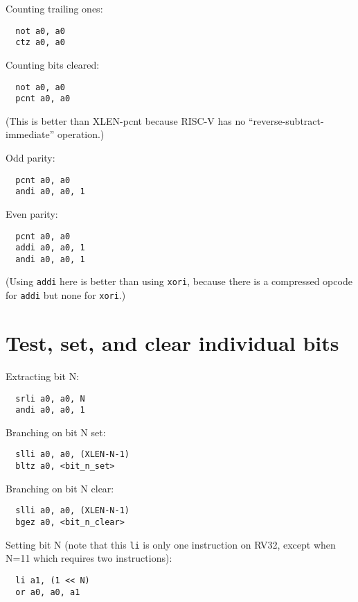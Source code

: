 Counting trailing ones:

\begin{verbatim}
  not a0, a0
  ctz a0, a0
\end{verbatim}

Counting bits cleared:

\begin{verbatim}
  not a0, a0
  pcnt a0, a0
\end{verbatim}

(This is better than XLEN-pcnt because RISC-V has no ``reverse-subtract-immediate'' operation.)

Odd parity:

\begin{verbatim}
  pcnt a0, a0
  andi a0, a0, 1
\end{verbatim}

Even parity:

\begin{verbatim}
  pcnt a0, a0
  addi a0, a0, 1
  andi a0, a0, 1
\end{verbatim}

(Using {\tt addi} here is better than using {\tt xori}, because there is
a compressed opcode for {\tt addi} but none for {\tt xori}.)


\section{Test, set, and clear individual bits}

Extracting bit N:

\begin{verbatim}
  srli a0, a0, N
  andi a0, a0, 1
\end{verbatim}

Branching on bit N set:

\begin{verbatim}
  slli a0, a0, (XLEN-N-1)
  bltz a0, <bit_n_set>
\end{verbatim}

Branching on bit N clear:

\begin{verbatim}
  slli a0, a0, (XLEN-N-1)
  bgez a0, <bit_n_clear>
\end{verbatim}

Setting bit N (note that this {\tt li} is only one instruction on RV32, except when N=11 which requires two instructions):

\begin{verbatim}
  li a1, (1 << N)
  or a0, a0, a1
\end{verbatim}


